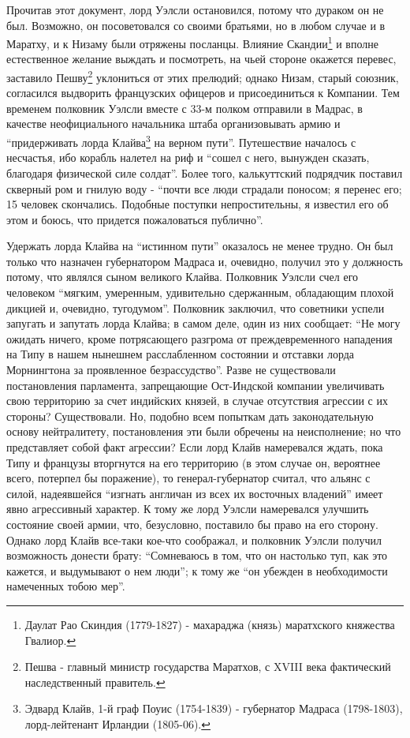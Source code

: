 \documentclass[
  oneside,
  12pt,
  titlepage]{book}
\begin{document}
Прочитав этот документ, лорд Уэлсли остановился, потому что дураком он не был. Возможно, он посоветовался со своими братьями, но в любом случае и в Маратху, и к Низаму были отряжены посланцы. Влияние Скандии\footnote{Даулат Рао Скиндия (1779-1827) - махараджа (князь) маратхского княжества Гвалиор.} и вполне естественное желание выждать и посмотреть, на чьей стороне окажется перевес, заставило Пешву\footnote{Пешва - главный министр государства Маратхов, с XVIII века фактический наследственный правитель.} уклониться от этих прелюдий; однако Низам, старый союзник, согласился выдворить французских офицеров и присоединиться к Компании. Тем временем полковник Уэлсли вместе с 33-м полком отправили в Мадрас, в качестве неофициального начальника штаба организовывать армию и ``придерживать лорда Клайва\footnote{Эдвард Клайв, 1-й граф Поуис (1754-1839) - губернатор Мадраса (1798-1803), лорд-лейтенант Ирландии (1805-06).} на верном пути''. Путешествие началось с несчастья, ибо корабль налетел на риф и ``сошел с него, вынужден сказать, благодаря физической силе солдат''. Более того, калькуттский подрядчик поставил скверный ром и гнилую воду - ``почти все люди страдали поносом; я перенес его; 15 человек скончались. Подобные поступки непростительны, я известил его об этом и боюсь, что придется пожаловаться публично''.

Удержать лорда Клайва на ``истинном пути'' оказалось не менее трудно. Он был только что назначен губернатором Мадраса и, очевидно, получил это у должность потому, что являлся сыном великого Клайва. Полковник Уэлсли счел его человеком ``мягким, умеренным, удивительно сдержанным, обладающим плохой дикцией и, очевидно, тугодумом''. Полковник заключил, что советники успели запугать и запутать лорда Клайва; в самом деле, один из них сообщает: ``Не могу ожидать ничего, кроме потрясающего разгрома от преждевременного нападения на Типу в нашем нынешнем расслабленном состоянии и отставки лорда Морнингтона за проявленное безрассудство''. Разве не существовали постановления парламента, запрещающие Ост-Индской компании увеличивать свою территорию за счет индийских князей, в случае отсутствия агрессии с их стороны? Существовали. Но, подобно всем попыткам дать законодательную основу нейтралитету, постановления эти были обречены на неисполнение; но что представляет собой факт агрессии? Если лорд Клайв намеревался ждать, пока Типу и французы вторгнутся на его территорию (в этом случае он, вероятнее всего, потерпел бы поражение), то генерал-губернатор считал, что альянс с силой, надеявшейся ``изгнать англичан из всех их восточных владений'' имеет явно агрессивный характер. К тому же лорд Уэлсли намеревался улучшить состояние своей армии, что, безусловно, поставило бы право на его сторону. Однако лорд Клайв все-таки кое-что соображал, и полковник Уэлсли получил возможность донести брату: ``Сомневаюсь в том, что он настолько туп, как это кажется, и выдумывают о нем люди''; к тому же ``он убежден в необходимости намеченных тобою мер''.
\end{document}
